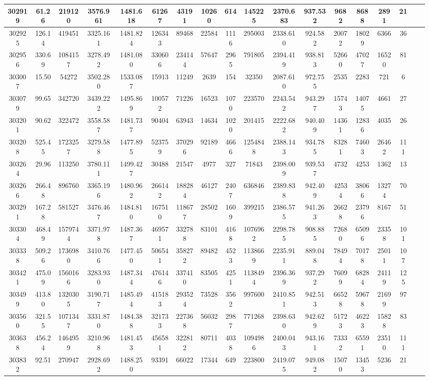 \documentclass[10pt]{extarticle}
\begin{document}
\begin{longtable}{|c|c|c|c|c|c|c|c|c|c|c|c|c|c|c|c|c|c|}
\hline 
302919&61.26&219120&3576.961&1481.618&61267&43191&10260&614&145225&2370.683&937.532&9682&8688&2891&21 \\ 
\hline 
302925&126.14&419451&3325.161&1481.824&126343&89468&22584&1116&295003&2338.610&924.582&20072&18029&6366&36 \\ 
\hline 
302956&330.69&1084157&3278.492&1481.080&330606&234144&57647&2965&791805&2394.419&938.813&52660&47027&16520&81 \\ 
\hline 
303007&15.50&54272&3502.280&1533.087&15913&11249&2639&154&32350&2087.610&972.755&2535&2283&721&6 \\ 
\hline 
303079&99.65&342720&3439.222&1495.869&100572&71226&16523&1070&223570&2243.542&943.297&15743&14075&4661&27 \\ 
\hline 
303201&90.62&322472&3558.587&1481.737&90404&63943&14634&1020&201415&2222.682&940.409&14361&12836&4035&26 \\ 
\hline 
303208&525.45&1723257&3279.588&1477.895&523759&370296&92189&4666&1254848&2388.143&934.785&83281&74603&26462&111 \\ 
\hline 
303264&29.96&113250&3780.111&1499.427&30488&21547&4977&327&71843&2398.009&939.537&4732&4253&1362&13 \\ 
\hline 
303266&266.48&896760&3365.196&1480.962&266142&188284&46127&2407&636846&2389.838&942.409&42534&38066&13274&70 \\ 
\hline 
303291&167.28&581527&3476.467&1484.810&167510&118677&28502&1609&399215&2386.575&941.263&26628&23796&8167&51 \\ 
\hline 
303304&468.49&1579744&3371.978&1487.367&469571&332788&83101&4168&1076962&2298.785&908.885&72680&65096&23358&101 \\ 
\hline 
303338&509.26&1736980&3410.766&1477.450&506541&358272&89482&4523&1138669&2235.911&889.048&78494&70178&25011&107 \\ 
\hline 
303421&475.09&1560166&3283.930&1487.344&476146&337410&83505&4251&1138494&2396.369&937.292&76099&68284&24119&125 \\ 
\hline 
303499&413.80&1320305&3190.717&1485.494&415183&293524&73528&3562&997600&2410.851&942.513&66528&59678&21699&97 \\ 
\hline 
303560&321.55&1071347&3331.870&1484.388&321733&227368&56032&2987&771268&2398.630&942.629&51723&46223&15828&83 \\ 
\hline 
303638&456.24&1464959&3210.968&1481.453&456581&322812&80711&4038&1094986&2400.043&943.161&73332&65591&23510&111 \\ 
\hline 
303832&92.51&270947&2928.692&1488.250&93391&66022&17344&649&223800&2419.075&949.082&15070&13453&5236&21 \\ 

\end{longtable}
\end{document}
